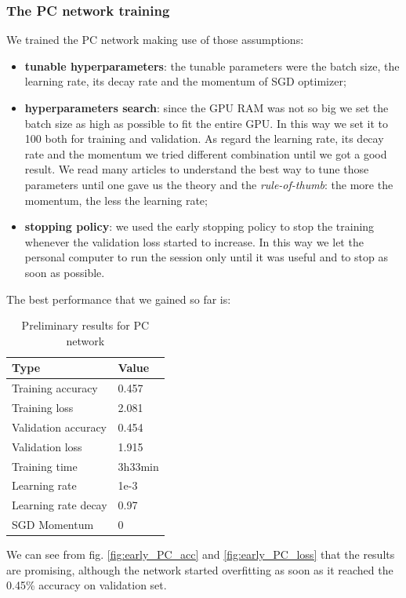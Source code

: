 \subsubsection{The PC network training}\label{sss:PC_training}
We trained the PC network making use of those assumptions:
\begin{itemize}
    \item \textbf{tunable hyperparameters}: the tunable parameters were the batch size, the learning rate, its decay rate and the momentum of SGD optimizer;
    \item \textbf{hyperparameters search}: since the GPU RAM was not so big we set the batch size as high as possible to fit the entire GPU. In this way we set it to 100 both for training and validation. As regard the learning rate, its decay rate and the momentum we tried different combination until we got a good result. We read many articles to understand the best way to tune those parameters until one \cite{SGD_momentum} gave us the theory and the \textit{rule-of-thumb}: the more the momentum, the less the learning rate;
    \item \textbf{stopping policy}: we used the early stopping policy to stop the training whenever the validation loss started to increase. In this way we let the personal computer to run the session only until it was useful and to stop as soon as possible.
\end{itemize}

The best performance that we gained so far is:
\begin{table}[!ht]
    \begin{center}
        \label{tab:PC_early_results}
        \begin{tabular}{l|l}
            \rowcolor{gray!50}
            \textbf{Type} & \textbf{Value} \\
            \hline
            Training accuracy & 0.457\\
            Training loss & 2.081\\
            Validation accuracy & 0.454\\
            Validation loss & 1.915\\
            Training time & 3h33min\\
            Learning rate & 1e-3\\
            Learning rate decay & 0.97\\
            SGD Momentum & 0\\
            \hline
        \end{tabular}
    \end{center}
    \caption{Preliminary results for PC network}
\end{table}
We can see from fig. \ref{fig:early_PC_acc} and \ref{fig:early_PC_loss} that the results are promising, although the network started overfitting as soon as it reached the 0.45\% accuracy on validation set.

